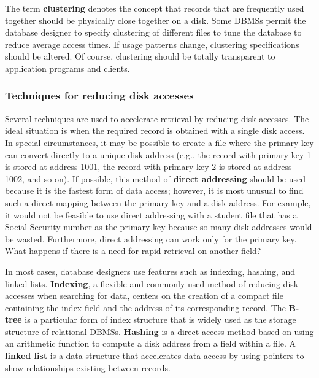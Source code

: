 \documentclass[
]{article}
\begin{document}
The term \textbf{clustering} denotes the concept that records that are
frequently used together should be physically close together on a disk.
Some DBMSs permit the database designer to specify clustering of
different files to tune the database to reduce average access times. If
usage patterns change, clustering specifications should be altered. Of
course, clustering should be totally transparent to application programs
and clients.

\hypertarget{techniques-for-reducing-disk-accesses}{%
\subsubsection*{Techniques for reducing disk accesses}\label{techniques-for-reducing-disk-accesses}}

Several techniques are used to accelerate retrieval by reducing disk
accesses. The ideal situation is when the required record is obtained
with a single disk access. In special circumstances, it may be possible
to create a file where the primary key can convert directly to a unique
disk address (e.g., the record with primary key 1 is stored at address
1001, the record with primary key 2 is stored at address 1002, and so
on). If possible, this method of \textbf{direct addressing} should be used
because it is the fastest form of data access; however, it is most
unusual to find such a direct mapping between the primary key and a disk
address. For example, it would not be feasible to use direct addressing
with a student file that has a Social Security number as the primary key
because so many disk addresses would be wasted. Furthermore, direct
addressing can work only for the primary key. What happens if there is a
need for rapid retrieval on another field?

In most cases, database designers use features such as indexing,
hashing, and linked lists. \textbf{Indexing}, a flexible and commonly used
method of reducing disk accesses when searching for data, centers on the
creation of a compact file containing the index field and the address of
its corresponding record. The \textbf{B-tree} is a particular form of index
structure that is widely used as the storage structure of relational
DBMSs. \textbf{Hashing} is a direct access method based on using an
arithmetic function to compute a disk address from a field within a
file. A \textbf{linked list} is a data structure that accelerates data access
by using pointers to show relationships existing between records.
\end{document}
